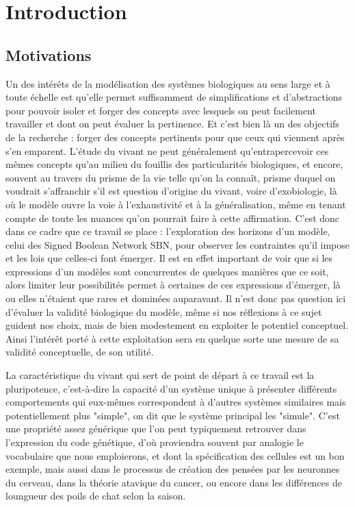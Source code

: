\documentclass[12pt, a4paper]{article}
\begin{document}
\newpage
\tableofcontents
\newpage

\section{Introduction}

\subsection{Motivations}

Un des intérêts de la modélisation des systèmes biologiques au sens large et à toute échelle est qu'elle permet suffisamment de simplifications et d'abstractions pour pouvoir isoler et forger des concepts avec lesquels on peut facilement travailler et dont on peut évaluer la pertinence. Et c'est bien là un des objectifs de la recherche : forger des concepts pertinents pour que ceux qui viennent après s'en emparent. L'étude du vivant ne peut généralement qu'entrapercevoir ces mêmes concepts qu'au milieu du fouillis des particularités biologiques, et encore, souvent au travers du prisme de la vie telle qu'on la connaît, prisme duquel on voudrait s'affranchir s'il est question d'origine du vivant, voire d'exobiologie, là où le modèle ouvre la voie à l'exhaustivité et à la généralisation, même en tenant compte de toute les nuances qu'on pourrait faire à cette affirmation. C'est donc dans ce cadre que ce travail se place : l'exploration des horizons d'un modèle, celui des Signed Boolean Network SBN, pour observer les contraintes qu'il impose et les lois que celles-ci font émerger. Il est en effet important de voir que si les expressions d'un modèles sont concurrentes de quelques manières que ce soit, alors limiter leur possibilités permet à certaines de ces expressions d'émerger, là ou elles n'étaient que rares et dominées auparavant. Il n'est donc pas question ici d'évaluer la validité biologique du modèle, même si nos réflexions à ce sujet guident nos choix, mais de bien modestement en exploiter le potentiel conceptuel. Ainsi l'intérêt porté à cette exploitation sera en quelque sorte une mesure de sa validité conceptuelle, de son utilité.

La caractéristique du vivant qui sert de point de départ à ce travail est la pluripotence, c'est-à-dire la capacité d'un système unique à présenter différents comportements qui eux-mêmes correspondent à d'autres systèmes similaires mais potentiellement plus "simple", on dit que le système principal les "simule". C'est une propriété assez générique que l'on peut typiquement retrouver dans l'expression du code génétique, d'où proviendra souvent par analogie le vocabulaire que nous emploierons, et dont la spécification des cellules est un bon exemple, mais aussi dans le processus de création des pensées par les neuronnes du cerveau, dans la théorie atavique du cancer, ou encore dans les différences de loungueur des poils de chat selon la saison. 
\end{document}

